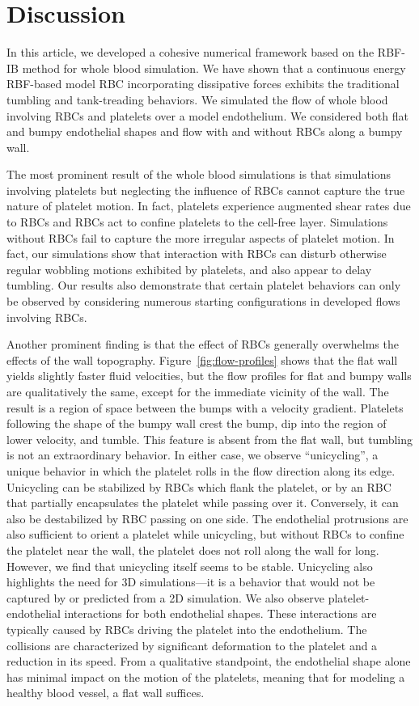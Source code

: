 \section{Discussion}\label{sec:conclusion}

In this article, we developed a cohesive numerical framework based on the RBF-IB method
for whole blood simulation. We have shown that a continuous energy RBF-based model RBC
incorporating dissipative forces exhibits the traditional tumbling and tank-treading
behaviors. We simulated the flow of whole blood involving RBCs and platelets over a model
endothelium. We considered both flat and bumpy endothelial shapes and flow with and
without RBCs along a bumpy wall.

The most prominent result of the whole blood simulations is that simulations involving
platelets but neglecting the influence of RBCs cannot capture the true nature of platelet
motion.  In fact, platelets experience augmented shear rates due to RBCs and RBCs act to
confine platelets to the cell-free layer. Simulations without RBCs fail to capture the
more irregular aspects of platelet motion. In fact, our simulations show that interaction
with RBCs can disturb otherwise regular wobbling motions exhibited by platelets, and also
appear to delay tumbling. Our results also demonstrate that certain platelet behaviors
can only be observed by considering numerous starting configurations in developed flows
involving RBCs.

Another prominent finding is that the effect of RBCs generally overwhelms the effects of
the wall topography. Figure~\ref{fig:flow-profiles} shows that the flat wall yields
slightly faster fluid velocities, but the flow profiles for flat and bumpy walls are
qualitatively the same, except for the immediate vicinity of the wall. The result is a
region of space between the bumps with a velocity gradient. Platelets following the shape
of the bumpy wall crest the bump, dip into the region of lower velocity, and tumble. This
feature is absent from the flat wall, but tumbling is not an extraordinary behavior. In
either case, we observe ``unicycling'', a unique behavior in which the platelet rolls in
the flow direction along its edge. Unicycling can be stabilized by RBCs which flank the
platelet, or by an RBC that partially encapsulates the platelet while passing over it.
Conversely, it can also be destabilized by RBC passing on one side.  The endothelial
protrusions are also sufficient to orient a platelet while unicycling, but without RBCs
to confine the platelet near the wall, the platelet does not roll along the wall for
long. However, we find that unicycling itself seems to be stable. Unicycling also
highlights the need for 3D simulations---it is a behavior that would not be captured by
or predicted from a 2D simulation. We also observe platelet-endothelial interactions for
both endothelial shapes. These interactions are typically caused by RBCs driving the
platelet into the endothelium. The collisions are characterized by significant
deformation to the platelet and a reduction in its speed. From a qualitative standpoint,
the endothelial shape alone has minimal impact on the motion of the platelets, meaning
that for modeling a healthy blood vessel, a flat wall suffices.

